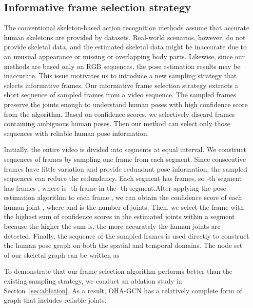 \documentclass[10pt,twocolumn,letterpaper]{article}
\begin{document}
\subsection{Informative frame selection strategy}
\label{sec:inf-select}

The conventional skeleton-based action recognition methods assume that accurate human skeletons are provided by datasets. 
Real-world scenarios, however, do not provide skeletal data, and the estimated skeletal data might be inaccurate due to an unusual appearance or missing or overlapping body parts.
Likewise, since our methods are based only on RGB sequences, the pose estimation results may be inaccurate.
This issue motivates us to introduce a new sampling strategy that selects informative frames. 
Our informative frame selection strategy extracts a short sequence of sampled frames from a video sequence. 
The sampled frames preserve the joints enough to understand human poses with high confidence score from the  algorithm.
Based on confidence scores, we selectively discard frames containing ambiguous human poses.
Then our method can select only those sequences with reliable human pose information. 


Initially, the entire video is divided into  segments  at equal interval.
We construct sequences of  frames by sampling one frame from each segment.
Since consecutive frames have little variation and provide redundant pose information, the sampled sequences can reduce the redundancy.
Each segment has  frames, so -th segment  has frames , where  is -th frame in the -th segment.After applying the pose estimation algorithm to each frame , we can obtain the confidence score  of each human joint , where  and  is the number of joints.
Then, we select the frame with the highest sum of confidence scores in the estimated joints within a segment because the higher the sum is, the more accurately the human joints are detected.
Finally, the sequence of the sampled frames is used directly to construct the human pose graph on both the spatial and temporal domains.
The node set of our skeletal graph can be written as

To demonstrate that our frame selection algorithm performs better than the existing sampling strategy, we conduct an ablation study in Section~\ref{sec:ablation}.
As a result, OHA-GCN has a relatively complete form of graph that includes reliable joints.
\end{document}
